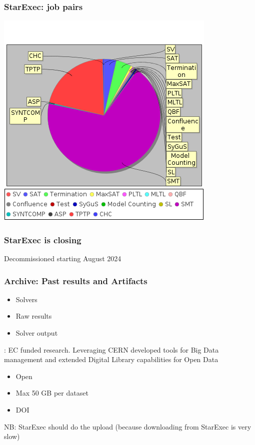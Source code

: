 \documentclass[table]{beamer}
\begin{document}
\begin{frame}
    \frametitle{StarExec: job pairs}
\begin{center}
    \includegraphics[width=\textwidth,height=\textheight,keepaspectratio]{statistics_starexec.png}
\end{center}

\end{frame}
\begin{frame}
    \frametitle{StarExec is closing}

    \begin{center}

        \huge{Decommissioned starting August 2024}
    \end{center}

\end{frame}


\begin{frame}
    \frametitle{Archive: Past results and Artifacts}

    \begin{itemize}
        \item Solvers
        \item Raw results
        \item Solver output
    \end{itemize}
    \vfill
    \pause
    \logozenodo: EC funded research. Leveraging CERN developed tools for Big Data management and extended Digital Library capabilities for Open Data
    \begin{itemize}
        \item Open
        \item Max 50 GB per dataset
        \item DOI
    \end{itemize}
\vfill
    NB: StarExec should do the upload (because downloading from StarExec is very slow)

\end{frame}
\end{document}
